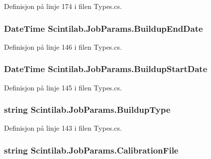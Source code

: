 Definisjon på linje 174 i filen Types.\+cs.

\hypertarget{class_scintilab_1_1_job_params_ad1bdea79a64a1e857b6a0f80ed3e63e7}{
\subsubsection[{Buildup\+End\+Date}]{\setlength{\rightskip}{0pt plus 5cm}Date\+Time Scintilab.\+Job\+Params.\+Buildup\+End\+Date}}\label{class_scintilab_1_1_job_params_ad1bdea79a64a1e857b6a0f80ed3e63e7}


Definisjon på linje 146 i filen Types.\+cs.

\hypertarget{class_scintilab_1_1_job_params_aa0d62e2ed96be6935c388a3401fd1f53}{
\subsubsection[{Buildup\+Start\+Date}]{\setlength{\rightskip}{0pt plus 5cm}Date\+Time Scintilab.\+Job\+Params.\+Buildup\+Start\+Date}}\label{class_scintilab_1_1_job_params_aa0d62e2ed96be6935c388a3401fd1f53}


Definisjon på linje 145 i filen Types.\+cs.

\hypertarget{class_scintilab_1_1_job_params_a1edc5d9d2cbdfaa9e7739c5d5413b61d}{
\subsubsection[{Buildup\+Type}]{\setlength{\rightskip}{0pt plus 5cm}string Scintilab.\+Job\+Params.\+Buildup\+Type}}\label{class_scintilab_1_1_job_params_a1edc5d9d2cbdfaa9e7739c5d5413b61d}


Definisjon på linje 143 i filen Types.\+cs.

\hypertarget{class_scintilab_1_1_job_params_a265274b89113071aaf8e397dd2bb71d5}{
\subsubsection[{Calibration\+File}]{\setlength{\rightskip}{0pt plus 5cm}string Scintilab.\+Job\+Params.\+Calibration\+File}}\label{class_scintilab_1_1_job_params_a265274b89113071aaf8e397dd2bb71d5}



